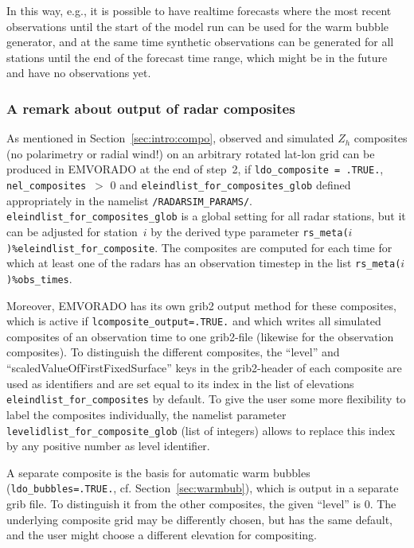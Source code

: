 \documentclass[10pt,a4paper,twoside,headinclude,footinclude,parskip=half]{scrartcl}
\newcommand{\myaktuellesection}{sec:intro}%
\newcommand{\labelsec}[1]{\label{#1}\renewcommand{\myaktuellesection}{#1}}%
\newcommand{\labelsec}[1]{\label{#1}}%
\newcommand{\srcform}[1]{\mbox{\texttt{#1}}\xspace}%
\newcommand{\paramform}[1]{\mbox{\texttt{#1}}\xspace}%
\begin{document}
In this way, e.g., it is possible to have realtime forecasts where the most recent observations until the start of the model run can be used
for the warm bubble generator, and at the same time synthetic observations can be generated for all stations until the end of the forecast time range, which might be in the future and have no observations yet.

\subsubsection{A remark about output of radar composites}

\labelsec{sec:comporemark}

 
As mentioned in Section~\ref{sec:intro:compo}, observed and simulated $Z_h$ composites (no polarimetry or radial wind!) on an arbitrary
rotated lat-lon grid can be 
produced in EMVORADO at the end of step~2, if \srcform{ldo_composite = .TRUE.}, \srcform{nel_composites}~$>$ 0 and
\srcform{eleindlist_for_composites_glob} defined appropriately in the namelist \srcform{/RADARSIM_PARAMS/}.
\srcform{eleindlist_for_composites_glob} is a global setting for all radar stations, but it can be
adjusted for station~$i$ by the derived type parameter \srcform{rs_meta($i$)\%eleindlist_for_composite}.
The composites are computed for each time for which at least one of the radars has an observation timestep in the list \paramform{rs_meta($i$)\%obs_times}.

Moreover, EMVORADO has its own grib2 output method for these composites,
which is active if \srcform{lcomposite_output=.TRUE.} and which writes all simulated composites
of an observation time to one grib2-file (likewise for the observation composites).
To distinguish the different composites, the ``level'' and ``scaledValueOfFirstFixedSurface'' keys in the grib2-header of each composite
are used as identifiers and are set equal to its index in the list of elevations \srcform{eleindlist_for_composites} by default.
To give the user some more flexibility to label the composites individually, the namelist parameter
\srcform{levelidlist_for_composite_glob} (list of integers) allows to replace this index by any positive number as level identifier.

A separate composite is the basis for automatic warm bubbles (\srcform{ldo_bubbles=.TRUE.}, cf. Section~\ref{sec:warmbub}), which 
is output in a separate grib file. To distinguish it from the other composites, the given ``level'' 
is 0. The underlying composite grid may be differently chosen, but has the same default, and the user might choose a different elevation for compositing.
\end{document}
